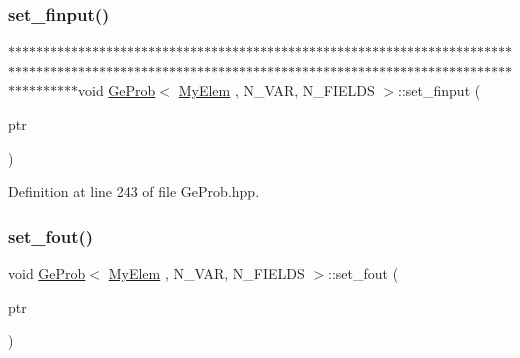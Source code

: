 \subsubsection{\texorpdfstring{set\+\_\+finput()}{set\_finput()}}
{\footnotesize\ttfamily $\ast$$\ast$$\ast$$\ast$$\ast$$\ast$$\ast$$\ast$$\ast$$\ast$$\ast$$\ast$$\ast$$\ast$$\ast$$\ast$$\ast$$\ast$$\ast$$\ast$$\ast$$\ast$$\ast$$\ast$$\ast$$\ast$$\ast$$\ast$$\ast$$\ast$$\ast$$\ast$$\ast$$\ast$$\ast$$\ast$$\ast$$\ast$$\ast$$\ast$$\ast$$\ast$$\ast$$\ast$$\ast$$\ast$$\ast$$\ast$$\ast$$\ast$$\ast$$\ast$$\ast$$\ast$$\ast$$\ast$$\ast$$\ast$$\ast$$\ast$$\ast$$\ast$$\ast$$\ast$$\ast$$\ast$$\ast$$\ast$$\ast$$\ast$$\ast$$\ast$$\ast$$\ast$$\ast$$\ast$$\ast$$\ast$$\ast$$\ast$$\ast$$\ast$$\ast$$\ast$$\ast$$\ast$$\ast$$\ast$$\ast$$\ast$$\ast$$\ast$$\ast$$\ast$$\ast$$\ast$$\ast$$\ast$$\ast$$\ast$$\ast$$\ast$$\ast$$\ast$$\ast$$\ast$$\ast$$\ast$$\ast$$\ast$$\ast$$\ast$$\ast$$\ast$$\ast$$\ast$$\ast$$\ast$$\ast$$\ast$$\ast$$\ast$$\ast$$\ast$$\ast$$\ast$$\ast$$\ast$$\ast$$\ast$$\ast$$\ast$$\ast$$\ast$$\ast$$\ast$$\ast$$\ast$$\ast$$\ast$$\ast$$\ast$$\ast$$\ast$$\ast$$\ast$$\ast$$\ast$$\ast$$\ast$$\ast$$\ast$$\ast$$\ast$void \hyperlink{classGeProb}{Ge\+Prob}$<$ \hyperlink{DG__Prob_8h_a83cd887ced9a6587428f267e50cd4787}{My\+Elem} , N\+\_\+\+V\+AR, N\+\_\+\+F\+I\+E\+L\+DS $>$\+::set\+\_\+finput (\begin{DoxyParamCaption}\item[{F\+I\+LE $\ast$}]{ptr }\end{DoxyParamCaption})\hspace{0.3cm}{\ttfamily [inherited]}}



Definition at line 243 of file Ge\+Prob.\+hpp.

\mbox{\label{classGeProb_adba307125006b1f5e0bd9a04e05cecf2}} 
\subsubsection{\texorpdfstring{set\+\_\+fout()}{set\_fout()}}
{\footnotesize\ttfamily void \hyperlink{classGeProb}{Ge\+Prob}$<$ \hyperlink{DG__Prob_8h_a83cd887ced9a6587428f267e50cd4787}{My\+Elem} , N\+\_\+\+V\+AR, N\+\_\+\+F\+I\+E\+L\+DS $>$\+::set\+\_\+fout (\begin{DoxyParamCaption}\item[{F\+I\+LE $\ast$}]{ptr }\end{DoxyParamCaption})\hspace{0.3cm}{\ttfamily [inherited]}}



